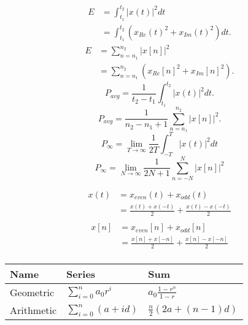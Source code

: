 \documentclass{article}
\begin{document}

\begin{align*}
    E & = \int_{t_1}^{t_2} |x(t)|^2 dt                     \\
      & = \int_{t_1}^{t_2} (x_{Re}(t)^2 + x_{Im}(t)^2) dt.
\end{align*}
\begin{align*}
    E & = \sum_{n=n_1}^{n_2} |x[n]|^2                     \\
      & = \sum_{n=n_1}^{n_2} (x_{Re}[n]^2 + x_{Im}[n]^2).
\end{align*}
\begin{equation*}
    P_{avg} = \frac{1}{t_2 - t_1} \int_{t_1}^{t_2} |x(t)|^2 dt.
\end{equation*}
\begin{equation*}
    P_{avg} = \frac{1}{n_2 - n_1 + 1} \sum_{n=n_1}^{n_2} |x[n]|^2.
\end{equation*}
\begin{equation*}
    P_{\infty} = \lim_{T \rightarrow \infty} \frac{1}{2T} \int_{-T}^{T} |x(t)|^2 dt
\end{equation*}
\begin{equation*}
    P_{\infty} = \lim_{N \rightarrow \infty} \frac{1}{2N + 1} \sum_{n=-N}^{N} |x[n]|^2
\end{equation*}

\begin{align*}
    x(t) & = x_{even}(t) + x_{odd}(t)                        \\
         & = \frac{x(t) + x(-t)}{2} + \frac{x(t) - x(-t)}{2} \\
\end{align*}
\begin{align*}
    x[n] & = x_{even}[n] + x_{odd}[n]                        \\
         & = \frac{x[n] + x[-n]}{2} + \frac{x[n] - x[-n]}{2} \\
\end{align*}

\begin{table}[]
    \begin{tabular}{l|l|l}
        Name       & Series                   & Sum                           \\
        \hline
        Geometric  & $\sum_{i=0}^{n} a_0 r^i$ & $a_0 \frac{1 - r^n}{1 - r}$   \\
        \hline
        Arithmetic & $\sum_{i=0}^{n} (a+id)$  & $\frac{n}{2} (2a + (n - 1)d)$
    \end{tabular}
\end{table}
\end{document}
